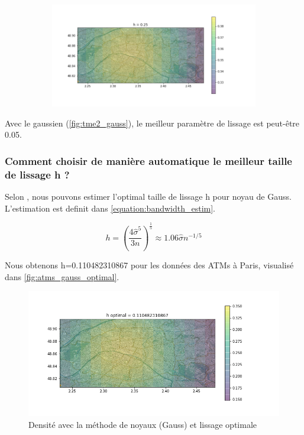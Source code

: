 \documentclass[a4paper,12pt]{article}
\begin{document}
\begin{figure}[h!]
\begin{subfigure}{.24\textwidth}
\end{subfigure}
\begin{subfigure}{.24\textwidth}
  \centering
	\includegraphics[width=\linewidth]{images/tme2/atms_gauss_3.png}
\end{subfigure}
\end{figure}

Avec le gaussien (\autoref{fig:tme2_gauss}), le meilleur paramètre de lissage est peut-être 0.05.

\subsubsection{Comment choisir de manière automatique le meilleur taille de lissage h ?}

Selon \citep{wiki:kernel_density}, nous pouvons estimer l’optimal taille de lissage h pour noyau de Gauss.
L’estimation est definit dans \autoref{equation:bandwidth_estim}.

\begin{equation}
\label{equation:bandwidth_estim}
h = \left(\frac{4\hat{\sigma}^5}{3n}\right)^{\frac{1}{5}} \approx 1.06 \hat{\sigma} n^{-1/5}
\end{equation}

Nous obtenons h=0.110482310867 pour les données des ATMs à Paris, visualisé dans \autoref{fig:atms_gauss_optimal}.

\begin{figure}[h!]
\caption{Densité avec la méthode de noyaux (Gauss) et lissage optimale}
\label{fig:atms_gauss_optimal}
\centering
\includegraphics[width=0.6\linewidth]{images/tme2/atms_gauss_optimal.png}
\end{figure}%
\end{document}
